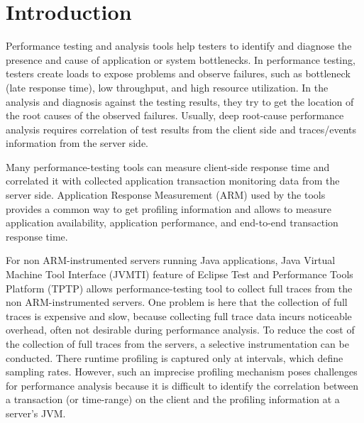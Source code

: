 \section{Introduction}
\label{sec:introduction}


Performance testing and analysis tools help testers to identify and diagnose the presence and cause of application or system bottlenecks. 
In performance testing, testers create loads to expose problems and observe failures, such as bottleneck (late response time), low throughput, and high resource utilization.
In the analysis and diagnosis against the testing results, they try to get the location of the root causes of the observed failures. 
Usually, deep root-cause performance analysis requires correlation of test results from the client side and traces/events information from the server side.

Many performance-testing tools \cite{RPT} \cite{LoadRunner} can measure client-side response time and correlated it with collected application transaction monitoring data from the server side. Application Response Measurement (ARM) \cite{ARM} used by the tools provides a common way to get profiling information and allows to measure application availability, application performance, and end-to-end transaction response time.

For non ARM-instrumented servers running Java applications, 
Java Virtual Machine Tool Interface (JVMTI) \cite{JVMTI} feature of Eclipse Test and Performance Tools Platform (TPTP) \cite{TPTP} allows performance-testing tool to collect full traces from the non ARM-instrumented servers. One problem is here that the collection of full traces is expensive and slow, 
because collecting full trace data incurs noticeable overhead, often not desirable during performance analysis.
To reduce the cost of the collection of full traces from the servers, a selective instrumentation can be conducted. There runtime profiling is captured only at intervals, which define sampling rates. However, such an imprecise profiling mechanism poses challenges for performance analysis because it is difficult to identify the correlation between a transaction (or time-range) on the client and the profiling information at a server's JVM.

